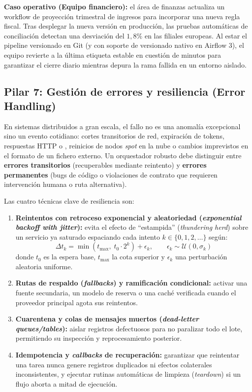 \textbf{Caso operativo (Equipo financiero):} el área de finanzas actualiza un workflow de proyección trimestral de ingresos para incorporar una nueva regla fiscal. Tras desplegar la nueva versión en producción, las pruebas automáticas de conciliación detectan una desviación del $1{,}8\%$ en las filiales europeas. Al estar el pipeline versionado en Git (y con soporte de versionado nativo en Airflow 3), el equipo revierte a la última etiqueta estable en cuestión de minutos para garantizar el cierre diario mientras depura la rama fallida en un entorno aislado.

\subsection{Pilar 7: Gestión de errores y resiliencia (Error Handling)}\label{subsec:pilar-errores}

En sistemas distribuidos a gran escala, el fallo no es una anomalía excepcional sino un evento cotidiano: cortes transitorios de red, expiración de tokens, respuestas HTTP  o , reinicios de nodos \textit{spot} en la nube o cambios imprevistos en el formato de un fichero externo. Un orquestador robusto debe distinguir entre \textbf{errores transitorios} (recuperables mediante reintento) y \textbf{errores permanentes} (bugs de código o violaciones de contrato que requieren intervención humana o ruta alternativa).

Las cuatro técnicas clave de resiliencia son:
\begin{enumerate}
  \item \textbf{Reintentos con retroceso exponencial y aleatoriedad (\textit{exponential backoff with jitter}):} evita el efecto de ``estampida'' (\textit{thundering herd}) sobre un servicio ya saturado espaciando cada intento $k \in \{0, 1, 2, \dots\}$ según:
  \begin{equation}\label{eq:backoff-jitter}
    \Delta t_k = \min\!\left(t_{\max},\; t_0 \cdot 2^{k}\right) + \epsilon_k, \qquad \epsilon_k \sim \mathcal{U}(0, \sigma_k)
  \end{equation}
  donde $t_0$ es la espera base, $t_{\max}$ la cota superior y $\epsilon_k$ una perturbación aleatoria uniforme.
  \item \textbf{Rutas de respaldo (\textit{fallbacks}) y ramificación condicional:} activar una fuente secundaria, un modelo de reserva o una caché verificada cuando el proveedor principal agota sus reintentos.
  \item \textbf{Cuarentena y colas de mensajes muertos (\textit{dead-letter queues/tables}):} aislar registros defectuosos para no paralizar todo el lote, permitiendo su inspección y reprocesamiento posterior.
  \item \textbf{Idempotencia y \textit{callbacks} de recuperación:} garantizar que reintentar una tarea nunca genere registros duplicados ni efectos colaterales inconsistentes, y ejecutar rutinas automáticas de limpieza (\textit{teardown}) si un flujo aborta a mitad de ejecución.
\end{enumerate}

